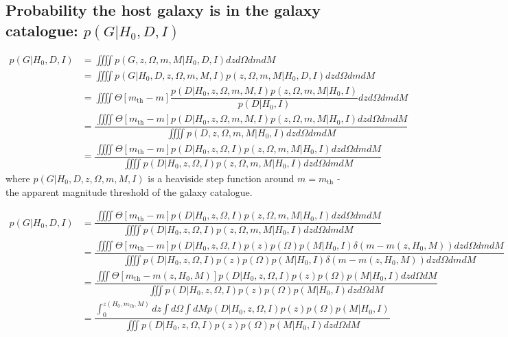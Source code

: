 \documentclass[a4paper,10pt]{article}
\begin{document}
{\subsection{Probability the host galaxy is in the galaxy catalogue: $p(G|H_0,D,I)$}


\begin{equation}
\begin{aligned}
p(G|H_0,D,I) &= \iiiint p(G,z,\Omega,m,M|H_0,D,I) dz d\Omega dm dM
\\ &= \iiiint p(G|H_0,D,z,\Omega,m,M,I) p(z,\Omega,m,M|H_0,D,I) dz d\Omega dm dM
\\ &= \iiiint \Theta[m_{\text{th}}-m] \dfrac{p(D|H_0,z,\Omega,m,M,I) p(z,\Omega,m,M|H_0,I)}{p(D|H_0,I)}  dz d\Omega dm dM
\\ &=  \dfrac{\iiiint \Theta[m_{\text{th}}-m] p(D|H_0,z,\Omega,m,M,I) p(z,\Omega,m,M|H_0,I) dz d\Omega dm dM}{\iiiint p(D,z,\Omega,m,M|H_0,I) dz d\Omega dm dM} 
\\ &=  \dfrac{\iiiint \Theta[m_{\text{th}}-m] p(D|H_0,z,\Omega,I) p(z,\Omega,m,M|H_0,I) dz d\Omega dm dM}{\iiiint p(D|H_0,z,\Omega,I) p(z,\Omega,m,M|H_0,I) dz d\Omega dm dM} 
\end{aligned}
\end{equation}
where $p(G|H_0,D,z,\Omega,m,M,I)$ is a heaviside step function around $m = m_{\text{th}}$ - the apparent magnitude threshold of the galaxy catalogue.

\begin{equation}
\begin{aligned}
p(G|H_0,D,I) &=  \dfrac{\iiiint \Theta[m_{\text{th}}-m] p(D|H_0,z,\Omega,I) p(z,\Omega,m,M|H_0,I) dz d\Omega dm dM}{\iiiint p(D|H_0,z,\Omega,I) p(z,\Omega,m,M|H_0,I) dz d\Omega dm dM} 
\\ &= \dfrac{\iiiint \Theta[m_{\text{th}}-m] p(D|H_0,z,\Omega,I) p(z)p(\Omega)p(M|H_0,I)\delta(m - m(z,H_0,M)) dz d\Omega dm dM}{\iiiint p(D|H_0,z,\Omega,I) p(z)p(\Omega)p(M|H_0,I)\delta(m - m(z,H_0,M)) dz d\Omega dm dM}
\\ &= \dfrac{\iiint \Theta[m_{\text{th}}-m(z,H_0,M)] p(D|H_0,z,\Omega,I) p(z)p(\Omega)p(M|H_0,I)dz d\Omega dM}{\iiint p(D|H_0,z,\Omega,I) p(z)p(\Omega)p(M|H_0,I) dz d\Omega dM}
\\ &= \dfrac{\int^{z(H_0,m_{\text{th}},M)}_0 dz \int d\Omega \int dM p(D|H_0,z,\Omega,I) p(z)p(\Omega)p(M|H_0,I)}{\iiint p(D|H_0,z,\Omega,I) p(z)p(\Omega)p(M|H_0,I) dz d\Omega dM}
\end{aligned}
\end{equation}


}
\end{document}
